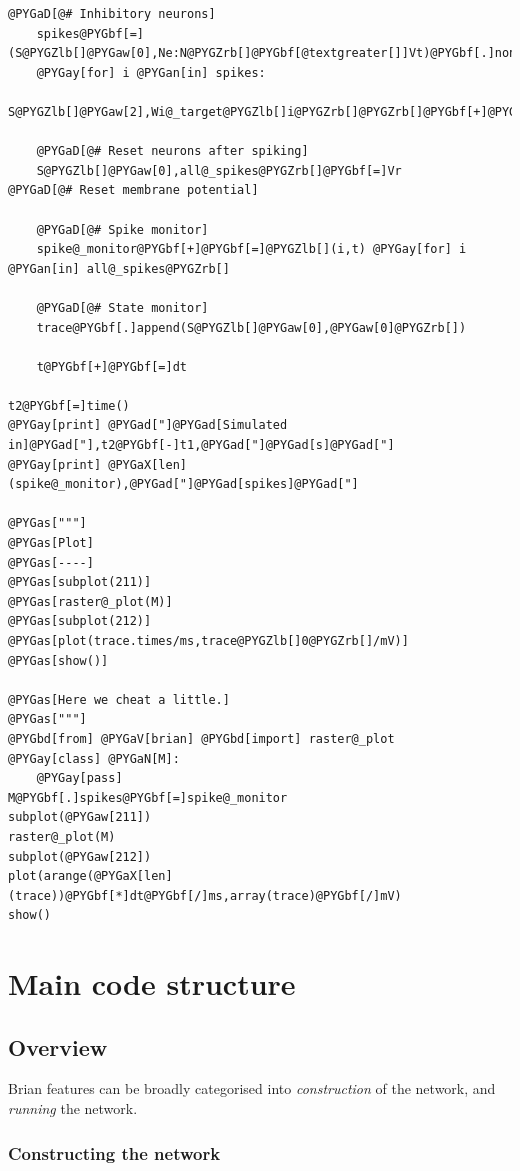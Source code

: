\documentclass[letterpaper,10pt,english]{manual}
\begin{document}
\begin{Verbatim}[commandchars=@\[\]]
    @PYGaD[@# Inhibitory neurons]
    spikes@PYGbf[=](S@PYGZlb[]@PYGaw[0],Ne:N@PYGZrb[]@PYGbf[@textgreater[]]Vt)@PYGbf[.]nonzero()@PYGZlb[]@PYGaw[0]@PYGZrb[]
    @PYGay[for] i @PYGan[in] spikes:
        S@PYGZlb[]@PYGaw[2],Wi@_target@PYGZlb[]i@PYGZrb[]@PYGZrb[]@PYGbf[+]@PYGbf[=]Wi@_weight@PYGZlb[]i@PYGZrb[]

    @PYGaD[@# Reset neurons after spiking]
    S@PYGZlb[]@PYGaw[0],all@_spikes@PYGZrb[]@PYGbf[=]Vr                       @PYGaD[@# Reset membrane potential]

    @PYGaD[@# Spike monitor]
    spike@_monitor@PYGbf[+]@PYGbf[=]@PYGZlb[](i,t) @PYGay[for] i @PYGan[in] all@_spikes@PYGZrb[]

    @PYGaD[@# State monitor]
    trace@PYGbf[.]append(S@PYGZlb[]@PYGaw[0],@PYGaw[0]@PYGZrb[])

    t@PYGbf[+]@PYGbf[=]dt

t2@PYGbf[=]time()
@PYGay[print] @PYGad["]@PYGad[Simulated in]@PYGad["],t2@PYGbf[-]t1,@PYGad["]@PYGad[s]@PYGad["]
@PYGay[print] @PYGaX[len](spike@_monitor),@PYGad["]@PYGad[spikes]@PYGad["]

@PYGas["""]
@PYGas[Plot]
@PYGas[----]
@PYGas[subplot(211)]
@PYGas[raster@_plot(M)]
@PYGas[subplot(212)]
@PYGas[plot(trace.times/ms,trace@PYGZlb[]0@PYGZrb[]/mV)]
@PYGas[show()]

@PYGas[Here we cheat a little.]
@PYGas["""]
@PYGbd[from] @PYGaV[brian] @PYGbd[import] raster@_plot
@PYGay[class] @PYGaN[M]:
    @PYGay[pass]
M@PYGbf[.]spikes@PYGbf[=]spike@_monitor
subplot(@PYGaw[211])
raster@_plot(M)
subplot(@PYGaw[212])
plot(arange(@PYGaX[len](trace))@PYGbf[*]dt@PYGbf[/]ms,array(trace)@PYGbf[/]mV)
show()
\end{Verbatim}

\resetcurrentobjects
\hypertarget{--doc-developer-codestructure}{}

\section{Main code structure}


\subsection{Overview}

Brian features can be broadly categorised into \emph{construction} of the network,
and \emph{running} the network.


\subsubsection{Constructing the network}
\end{document}
